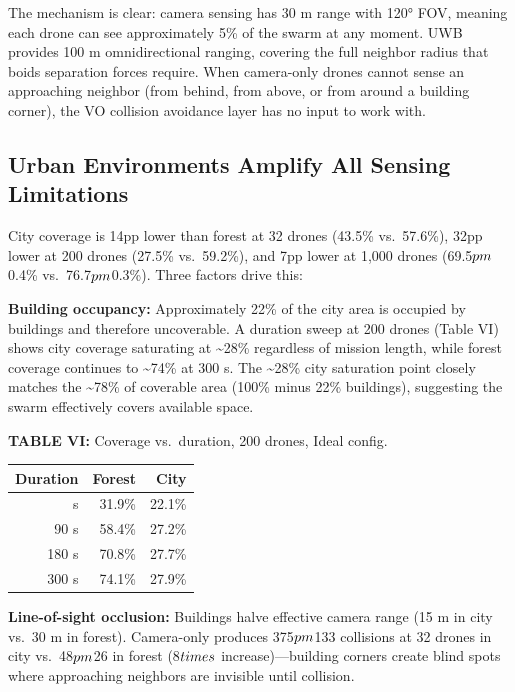 \documentclass[conference]{IEEEtran}
\begin{document}
The mechanism is clear: camera sensing has 30 m range with 120° FOV,
meaning each drone can see approximately 5\% of the swarm at any moment.
UWB provides 100 m omnidirectional ranging, covering the full neighbor
radius that boids separation forces require. When camera-only drones
cannot sense an approaching neighbor (from behind, from above, or from
around a building corner), the VO collision avoidance layer has no input
to work with.

\subsection{Urban Environments Amplify All Sensing Limitations}\label{c.-urban-environments-amplify-all-sensing-limitations}

City coverage is 14pp lower than forest at 32 drones (43.5\%
vs.~57.6\%), 32pp lower at 200 drones (27.5\% vs.~59.2\%), and 7pp lower
at 1,000 drones (69.5$\\pm$0.4\% vs.~76.7$\\pm$0.3\%). Three factors drive this:

\textbf{Building occupancy:} Approximately 22\% of the city area is
occupied by buildings and therefore uncoverable. A duration sweep at 200
drones (Table VI) shows city coverage saturating at \textasciitilde28\%
regardless of mission length, while forest coverage continues to
\textasciitilde74\% at 300 s. The \textasciitilde28\% city saturation
point closely matches the \textasciitilde78\% of coverable area (100\%
minus 22\% buildings), suggesting the swarm effectively covers available
space.

\textbf{TABLE VI:} Coverage vs.~duration, 200 drones, Ideal config.

{\def\LTcaptype{none} %
\begin{longtable}[]{@{}rrr@{}}
\toprule\noalign{}
Duration & Forest & City \\
\midrule\noalign{}
\endhead
\bottomrule\noalign{}
\endlastfoot
30 s & 31.9\% & 22.1\% \\
90 s & 58.4\% & 27.2\% \\
180 s & 70.8\% & 27.7\% \\
300 s & 74.1\% & 27.9\% \\
\end{longtable}
}

\textbf{Line-of-sight occlusion:} Buildings halve effective camera range
(15 m in city vs.~30 m in forest). Camera-only produces 375$\\pm$133
collisions at 32 drones in city vs.~48$\\pm$26 in forest (8$\\times$
increase)---building corners create blind spots where approaching
neighbors are invisible until collision.
\end{document}
